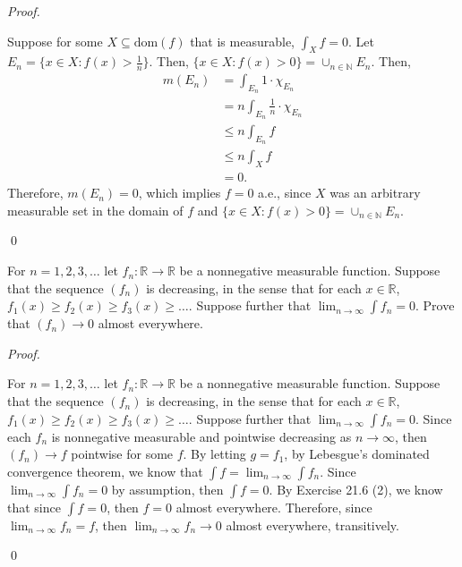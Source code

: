 \documentclass[12pt]{article}
\newenvironment{problem}[2][Problem]{\begin{trivlist}
\item[\hskip \labelsep {\bfseries #1}\hskip \labelsep {\bfseries
#2.}]}{\end{trivlist}}
\newenvironment{sol}
    {\emph{Proof.}
    }
    {
    \qed
    }
\begin{document}
\begin{sol}
  Suppose for some $X \subseteq \text{dom}(f)$ that is measurable, $\int_X f = 0$. Let $E_n = \{x \in X : f(x) > \frac{1}{n}\}$. Then, $\{x \in X : f(x) > 0\} = \cup_{n \in \mathbb{N}}E_n$. Then, 
          \begin{align*}
            m(E_n) &= \int_{E_n}1 \cdot \chi_{E_n} \\
            &= n \int_{E_n} \frac{1}{n} \cdot \chi_{E_n} \\
            &\leq n \int_{E_n} f \\
            &\leq n \int_{X} f \\
            &=0.
          \end{align*}
          Therefore, $m(E_n) = 0$, which implies $f = 0$ a.e., since $X$ was an arbitrary measurable set in the domain of $f$ and $\{x \in X : f(x) > 0\} = \cup_{n \in \mathbb{N}}E_n$.
\end{sol}

\begin{problem}{5}
For $n = 1,2,3,\dots$ let $f_n : \mathbb{R} \to \mathbb{R}$ be a nonnegative measurable function. Suppose that the sequence $(f_n)$ is decreasing, in the sense that for each $x \in \mathbb{R}$, $f_1(x) \geq f_2(x) \geq f_3(x) \geq \dots$. Suppose further that $\lim_{n \to \infty} \int f_n = 0$. Prove that $(f_n) \to 0$ almost everywhere.
\end{problem}

\begin{sol}
  For $n = 1,2,3,\dots$ let $f_n : \mathbb{R} \to \mathbb{R}$ be a nonnegative measurable function. Suppose that the sequence $(f_n)$ is decreasing, in the sense that for each $x \in \mathbb{R}$, $f_1(x) \geq f_2(x) \geq f_3(x) \geq \dots$. Suppose further that $\lim_{n \to \infty} \int f_n = 0$. Since each $f_n$ is nonnegative measurable and pointwise decreasing as $n \to \infty$, then $(f_n) \to f$ pointwise for some $f$. By letting $g = f_1$, by Lebesgue's dominated convergence theorem, we know that $\int f = \lim_{n \to \infty} \int f_n$. Since $\lim_{n \to \infty} \int f_n = 0$ by assumption, then $\int f = 0$. By Exercise 21.6 (2), we know that since $\int f = 0$, then $f = 0$ almost everywhere. Therefore, since $\lim_{n \to \infty} f_n = f$, then $\lim_{n \to \infty} f_n \to 0$ almost everywhere, transitively.
\end{sol}
\end{document}
